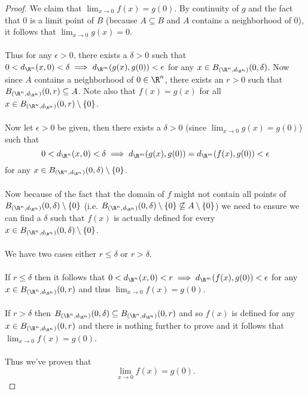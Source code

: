 	  	\begin{proof}
	  		We claim that $\lim_{x \to 0} f(x) = g(0)$. By continuity of $g$ and the fact that $0$ is a limit point of $B$ (because $A \subseteq B$ and $A$ contains a neighborhood of $0$), it follows that $\lim_{x \to 0} g(x) = 0$. \\ \\Thus for any $\epsilon > 0$, there exists a $\delta > 0$ such that $0 < d_{\R^n}(x, 0) < \delta \implies d_{\R^m}(g(x), g(0)) < \epsilon$ for any $x \in  B_{\left( \R^n, d_{\R^n}\right) }(0, \delta)$. Now since $A$ contains a neighborhood of $0 \in \R^n$, there exists an $r > 0$ such that $B_{\left( \R^n, d_{\R^n}\right) }(0, r) \subseteq A$. Note also that $f(x) = g(x)$ for all $x \in B_{\left( \R^n, d_{\R^n}\right) }(0, r) \setminus \{0\}$. \\\\
	  		Now let $\epsilon > 0$ be given, then there exists a $\delta > 0$ (since $\lim_{x \to 0}g(x) = g(0)$) such that $$0 < d_{\R^n}(x, 0) < \delta \implies d_{\R^m}(g(x), g(0)) = d_{\R^m}(f(x), g(0))  < \epsilon$$ for any $x \in  B_{\left( \R^n, d_{\R^n}\right) }(0, \delta) \setminus \{0\}$. \\ \\
	  		Now because of the fact that the domain of $f$ might not contain all points of $B_{\left( \R^n, d_{\R^n}\right) }(0, \delta) \setminus \{0\}$ (i.e. $B_{\left( \R^n, d_{\R^n}\right) }(0, \delta) \setminus \{0\} \not\subseteq A \setminus \{0\}$) we need to ensure we can find a $\delta$ such that $f(x)$ is actually defined for every $x \in  B_{\left( \R^n, d_{\R^n}\right) }(0, \delta) \setminus \{0\}$. \\ \\
	  		We have two cases either $r \leq \delta$ or $r > \delta$. \\ \\
	  		If $r \leq \delta$ then it follows that $0 < d_{\R^n}(x, 0)  < r \implies d_{\R^m}(f(x), g(0)) < \epsilon$ for any $x \in  B_{\left( \R^n, d_{\R^n}\right) }(0, r)$ and thus $\lim_{x \to 0} f(x) = g(0)$. \\ \\
	  		If $r > \delta$ then $B_{\left( \R^n, d_{\R^n}\right) }(0, \delta) \subseteq B_{\left( \R^n, d_{\R^n}\right) }(0, r)$ and so $f(x)$ is defined for any $x \in B_{\left( \R^n, d_{\R^n}\right) }(0, r)$ and there is nothing further to prove and it follows that $\lim_{x \to 0} f(x) = g(0)$. \\ \\ Thus we've proven that $$\lim_{x \to 0} f(x) = g(0).$$
	  	\end{proof}
	  	
